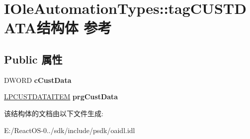 \hypertarget{struct_i_ole_automation_types_1_1tag_c_u_s_t_d_a_t_a}{}\section{I\+Ole\+Automation\+Types\+:\+:tag\+C\+U\+S\+T\+D\+A\+T\+A结构体 参考}
\label{struct_i_ole_automation_types_1_1tag_c_u_s_t_d_a_t_a}
\subsection*{Public 属性}
\begin{DoxyCompactItemize}
\item 
\mbox{\label{struct_i_ole_automation_types_1_1tag_c_u_s_t_d_a_t_a_a6b6a3b7c15c085cde7ae73923c4cca95}} 
D\+W\+O\+RD {\bfseries c\+Cust\+Data}
\item 
\mbox{\label{struct_i_ole_automation_types_1_1tag_c_u_s_t_d_a_t_a_aad827ab8fae507eae343974111b21508}} 
\hyperlink{struct_i_ole_automation_types_1_1tag_c_u_s_t_d_a_t_a_i_t_e_m}{L\+P\+C\+U\+S\+T\+D\+A\+T\+A\+I\+T\+EM} {\bfseries prg\+Cust\+Data}
\end{DoxyCompactItemize}


该结构体的文档由以下文件生成\+:\begin{DoxyCompactItemize}
\item 
E\+:/\+React\+O\+S-\/0../sdk/include/psdk/oaidl.\+idl\end{DoxyCompactItemize}
